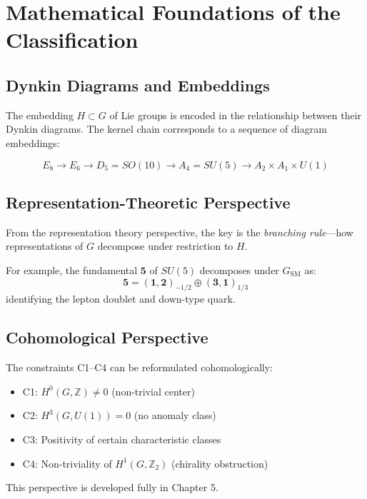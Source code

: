 \documentclass[11pt,a4paper,openright]{book}
\theoremstyle{plain}
\theoremstyle{definition}
\newcommand{\SM}{\mathrm{SM}}
\newcommand{\Z}{\mathbb{Z}}
\begin{document}
\section{Mathematical Foundations of the Classification}

\subsection{Dynkin Diagrams and Embeddings}

The embedding $H \subset G$ of Lie groups is encoded in the relationship between their Dynkin diagrams. The kernel chain corresponds to a sequence of diagram embeddings:

\[
E_8 \to E_6 \to D_5 = SO(10) \to A_4 = SU(5) \to A_2 \times A_1 \times U(1)
\]

\subsection{Representation-Theoretic Perspective}

From the representation theory perspective, the key is the \emph{branching rule}---how representations of $G$ decompose under restriction to $H$.

For example, the fundamental $\mathbf{5}$ of $SU(5)$ decomposes under $G_{\SM}$ as:
\begin{equation}
\mathbf{5} = (\mathbf{1}, \mathbf{2})_{-1/2} \oplus (\mathbf{3}, \mathbf{1})_{1/3}
\end{equation}
identifying the lepton doublet and down-type quark.

\subsection{Cohomological Perspective}

The constraints C1--C4 can be reformulated cohomologically:

\begin{itemize}
    \item C1: $H^0(G, \Z) \neq 0$ (non-trivial center)
    \item C2: $H^3(G, U(1)) = 0$ (no anomaly class)
    \item C3: Positivity of certain characteristic classes
    \item C4: Non-triviality of $H^1(G, \Z_2)$ (chirality obstruction)
\end{itemize}

This perspective is developed fully in Chapter 5.
\end{document}
